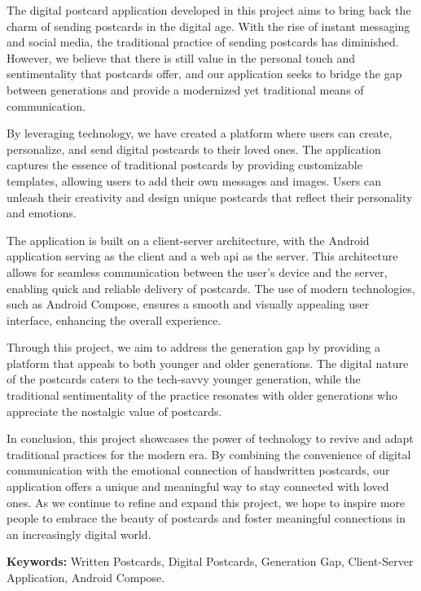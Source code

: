 


\noindent

The digital postcard application developed in this project aims to bring back the charm of sending postcards in the digital age. With the rise of instant messaging and social media, the traditional practice of sending postcards has diminished. However, we believe that there is still value in the personal touch and sentimentality that postcards offer, and our application seeks to bridge the gap between generations and provide a modernized yet traditional means of communication.

By leveraging technology, we have created a platform where users can create, personalize, and send digital postcards to their loved ones. The application captures the essence of traditional postcards by providing customizable templates, allowing users to add their own messages and images. Users can unleash their creativity and design unique postcards that reflect their personality and emotions.

The application is built on a client-server architecture, with the Android application serving as the client and a web \gls{api} as the server. This architecture allows for seamless communication between the user's device and the server, enabling quick and reliable delivery of postcards. The use of modern technologies, such as Android Compose, ensures a smooth and visually appealing user interface, enhancing the overall experience.

Through this project, we aim to address the generation gap by providing a platform that appeals to both younger and older generations. The digital nature of the postcards caters to the tech-savvy younger generation, while the traditional sentimentality of the practice resonates with older generations who appreciate the nostalgic value of postcards.

In conclusion, this project showcases the power of technology to revive and adapt traditional practices for the modern era. By combining the convenience of digital communication with the emotional connection of handwritten postcards, our application offers a unique and meaningful way to stay connected with loved ones. As we continue to refine and expand this project, we hope to inspire more people to embrace the beauty of postcards and foster meaningful connections in an increasingly digital world.

\vspace*{1em}

\textbf{\large{Keywords:}} Written Postcards, Digital Postcards, Generation Gap, Client-Server Application, Android Compose.


